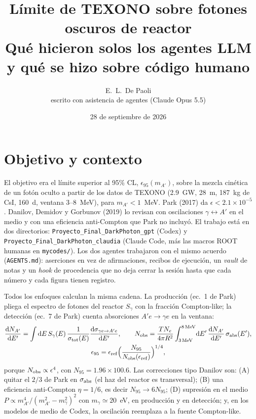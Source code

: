\documentclass[10pt,a4paper]{article}
\title{\vspace{-1.2cm}Límite de TEXONO sobre fotones oscuros de reactor\\[2pt]
\large Qué hicieron solos los agentes LLM y qué se hizo sobre código humano}
\author{E.~L.~De Paoli\\[2pt]\small escrito con asistencia de agentes (Claude Opus 5.5)}
\date{28 de septiembre de 2026}
\newcommand{\Ap}{A'}
\newcommand{\eps}{\epsilon}
\newcommand{\dd}{\mathrm{d}}
\newcommand{\ttt}[1]{\texttt{\small #1}}
\begin{document}
\maketitle
\vspace{-0.6cm}

\section{Objetivo y contexto}
El objetivo era el límite superior al 95\% CL, $\eps_{95}(m_{\Ap})$, sobre la mezcla cinética de un fotón oculto a partir
de los datos de TEXONO (2.9~GW, 28~m, 187~kg de CsI, 160~d, ventana 3--8~MeV), para $m_{\Ap}<1$~MeV. Park (2017) da
$\eps<2.1\times10^{-5}$. Danilov, Demidov y Gorbunov (2019) lo revisan con oscilaciones $\gamma\leftrightarrow\Ap$ en el
medio y con una eficiencia anti-Compton que Park no incluyó. El trabajo está en dos directorios:
\ttt{Proyecto\_Final\_DarkPhoton\_gpt} (Codex) y \ttt{Proyecto\_Final\_DarkPhoton\_claudia} (Claude Code, más las macros
ROOT humanas en \ttt{mycodes/}). Los dos agentes trabajaron con el mismo acuerdo (\ttt{AGENTS.md}): aserciones en vez de
afirmaciones, recibos de ejecución, un \emph{vault} de notas y un \emph{hook} de procedencia que no deja cerrar la sesión
hasta que cada número y cada figura tienen registro.

Todos los enfoques calculan la misma cadena. La producción (ec.~1 de Park) pliega el espectro de fotones del reactor
$S_\gamma$ con la fracción Compton-like; la detección (ec.~7 de Park) cuenta absorciones $\Ap e\to\gamma e$ en la ventana:
\begin{gather}
\frac{\dd N_{\Ap}}{\dd E'}=\int \dd E\,S_\gamma(E)\,\frac{1}{\sigma_{\rm tot}(E)}\frac{\dd\sigma_{\gamma e\to\Ap e}}{\dd E'},\qquad
N_{\rm obs}=\frac{T N_e}{4\pi R^2}\int_{3\,\rm MeV}^{8\,\rm MeV}\!\dd E'\,\frac{\dd N_{\Ap}}{\dd E'}\,\sigma_{\rm abs}(E'),\nonumber\\
\eps_{95}=\eps_{\rm ref}\Big(\frac{N_{95}}{N_{\rm obs}(\eps_{\rm ref})}\Big)^{1/4},
\end{gather}
porque $N_{\rm obs}\propto\eps^4$, con $N_{95}=1.96\times100.6$. Las correcciones tipo Danilov son:
(A) quitar el $2/3$ de Park en $\sigma_{\rm abs}$ (el haz del reactor es transversal);
(B) una eficiencia anti-Compton $\eta=1/6$, es decir $N_{95}\to6N_{95}$;
(D) supresión en el medio $P\propto m_{\Ap}^4/(m_{\Ap}^2-m_\gamma^2)^2$ con $m_\gamma\simeq20$~eV, en producción y en detección;
y, en los modelos de medio de Codex, la oscilación reemplaza a la fuente Compton-like.
\end{document}
